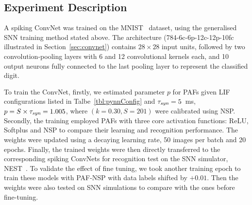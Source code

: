 	\subsection{Experiment Description}
	\label{subsec:expDesr}
	A spiking ConvNet was trained on the MNIST~\citep{lecun1998gradient} dataset, 
	using the generalised SNN training method stated above.
	The architecture (784-6c-6p-12c-12p-10fc illustrated in Section~\ref{sec:convnet}) contains $28\times28$ input units, followed by two convolution-pooling layers with 6 and 12 convolutional kernels each, and 10 output neurons fully connected to the last pooling layer to represent the classified digit.

	To train the ConvNet, firstly, we estimated parameter $p$ for PAFs given LIF configurations listed in Talbe~\ref{tbl:pynnConfig} and $\tau_{\textit{\textrm{syn}}}=5$~ms, $p = S \times \tau_{\textit{\textrm{syn}}} = 1.005$, where $(k=0.30, S=201)$ were calibrated using NSP. 
	Secondly, the training employed PAFs with three core activation functions: ReLU, Softplus and NSP to compare their learning and recognition performance.
	The weights were updated using a decaying learning rate, 50 images per batch and 20 epochs.
	Finally, the trained weights were then directly transferred to the corresponding spiking ConvNets for recognition test on the SNN simulator, NEST~\citep{gewaltig2007nest}.
	To validate the effect of fine tuning, we took another training epoch to train these models with PAF-NSP with data labels shifted by $+0.01$.
	Then the weights were also tested on SNN simulations to compare with the ones before fine-tuning.

